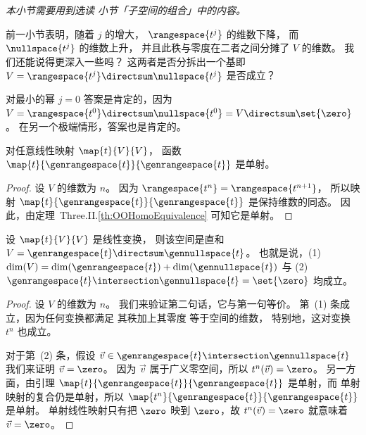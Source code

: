 \noindent\textit{本小节需要用到选读
    小节「子空间的组合」中的内容。}

前一小节表明，随着 \( j \) 的增大，
$\rangespace{t^j}$ 的维数下降，
而 $\nullspace{t^j}$ 的维数上升，
并且此秩与零度在二者之间分摊了
$V$ 的维数。
我们还能说得更深入一些吗？
这两者是否分拆出一个基\Dash 即
\( V=\rangespace{t^j}\directsum\nullspace{t^j} \) 是否成立？

对最小的幂 $j=0$ 答案是肯定的，因为
\( V=\rangespace{t^0}\directsum\nullspace{t^0}=V\directsum\set{\zero} \)。
在另一个极端情形，答案也是肯定的。

\begin{lemma} \label{lem:RestONeToOne}
对任意线性映射 \( \map{t}{V}{V} \)，
函数 \( \map{t}{\genrangespace{t}}{\genrangespace{t}} \)
是单射。
\end{lemma}

\begin{proof}
设 $V$ 的维数为 $n$。
因为 \( \rangespace{t^n}=\rangespace{t^{n+1}} \)，
所以映射 \( \map{t}{\genrangespace{t}}{\genrangespace{t}} \)
是保持维数的同态。
因此，由定理~Three.II.\ref{th:OOHomoEquivalence} 可知它是单射。
\end{proof}

\begin{corollary} \label{GenRngNullDirSumToSp}
设 \( \map{t}{V}{V} \) 是线性变换，
则该空间是直和
\( V=\genrangespace{t}\directsum\gennullspace{t} \)。
也就是说，(1)~\( \dim(V)=\dim(\genrangespace{t})+\dim(\gennullspace{t}) \)
与 (2)~\( \genrangespace{t}\intersection\gennullspace{t}=\set{\zero} \)
均成立。
\end{corollary}

\begin{proof}
设 $V$ 的维数为 $n$。
我们来验证第二句话，它与第一句等价。
第~(1) 条成立，因为任何变换都满足
其秩加上其零度
等于空间的维数，
特别地，这对变换 $t^n$ 也成立。

对于第~(2) 条，假设
\( \vec{v}\in\genrangespace{t}\intersection\gennullspace{t} \)
我们来证明 $\vec{v}=\zero$。
因为 \( \vec{v} \) 属于广义零空间，所以 \( t^n(\vec{v})=\zero \)。
另一方面，由引理
\( \map{t}{\genrangespace{t}}{\genrangespace{t}} \)
是单射，而
单射映射的复合仍是单射，所以
\( \map{t^n}{\genrangespace{t}}{\genrangespace{t}} \) 是单射。
单射线性映射只有把 \( \zero \) 映到
\( \zero \)，故 \( t^n(\vec{v})=\zero \) 就意味着
\( \vec{v}=\zero \)。
\end{proof}

